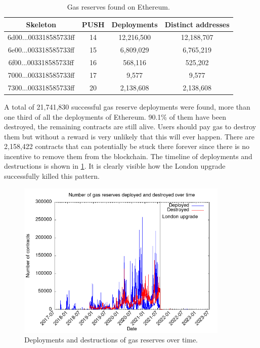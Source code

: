 \begin{table}[H]
\centering
    \begin{threeparttable}
    \begin{tabular}{ c c c c } 
    \toprule
    \textbf{Skeleton} & \textbf{PUSH} & \textbf{Deployments} & \textbf{Distinct addresses} \\
    \midrule  
    \small{6d00...003318585733ff} & 14 & 12,216,500 & 12,188,707 \\ [1.2ex]
    \small{6e00...003318585733ff} & 15 & 6,809,029 & 6,765,219 \\ [1.2ex]
    \small{6f00...003318585733ff} & 16 & 568,116 & 525,202 \\ [1.2ex]
    \small{7000...003318585733ff} & 17 & 9,577 & 9,577 \\ [1.2ex]
    \small{7300...003318585733ff} & 20 & 2,138,608 & 2,138,608 \\ [1.2ex]
    \bottomrule
    \end{tabular}
    \end{threeparttable}
    \caption{Gas reserves found on Ethereum.}
    \label{table:gas-reserve-deployments}
\end{table}

A total of 21,741,830 successful gas reserve deployments were found, more than one third of all the deployments of Ethereum. 90.1\% of them have been destroyed, the remaining contracts are still alive. Users should pay gas to destroy them but without a reward is very unlikely that this will ever happen. There are 2,158,422 contracts that can potentially be stuck there forever since there is no incentive to remove them from the blockchain. The timeline of deployments and destructions is shown in \cref{fig:gastokens-timeline}. It is clearly visible how the London upgrade successfully killed this pattern.

\begin{figure}[!ht]
    \centering
    \includegraphics[width=0.9\textwidth]{Figures/analysis/gastokens-timeline.png}
    \caption{Deployments and destructions of gas reserves over time.}
    \label{fig:gastokens-timeline}
\end{figure}

